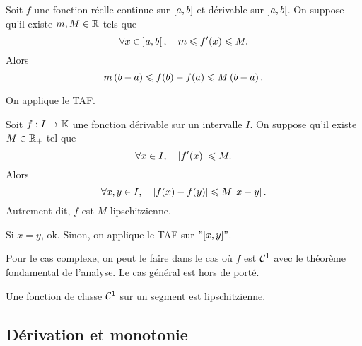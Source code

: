 \documentclass{magnoliaold}
\begin{document}
\begin{proposition}[utile=-3,nom={Inégalité des accroissements finis}]
Soit $f$ une fonction réelle continue sur $\left[a,b\right]$ et
dérivable sur $\left]a,b\right[$. On suppose qu'il existe $m,M\in\mathbb{R}$ tels que
\[\forall x\in\left]a,b\right[ ,\quad m\leqslant f'(x)\leqslant M.\]
 Alors
\[m\left(b-a\right)\leqslant f(b)-f(a)\leqslant M\left(b-a\right).\]
\end{proposition}

\begin{preuve}
On applique le TAF.
\end{preuve}

\begin{proposition}[nom={Inégalité des accroissements finis}]
Soit $f:I\to\mathbb{K}$ une fonction dérivable sur un intervalle $I$.
On suppose qu'il existe $M\in\mathbb{R}_+$ tel que
\[\forall x\in I ,\quad \left|f'(x)\right|\leqslant M.\]
Alors
\[\forall x, y\in I,\quad \left|f(x)-f(y)\right|\leqslant M\left|x-y\right|.\]
Autrement dit, $f$ est $M$-lipschitzienne.
\end{proposition}

\begin{preuve}
  Si $x=y$, ok. Sinon, on applique le TAF sur $"[x,y]"$.
  
  Pour le cas complexe, on peut le faire dans le cas où $f$ est $\mathcal{C}^{1}$ avec le théorème fondamental de l'analyse. Le cas général est hors de porté.
  \end{preuve}

\begin{remarqueUnique}
\remarque Une fonction de classe $\mathcal{C}^{1}$ sur un segment est
  lipschitzienne.
\end{remarqueUnique}


\subsection{Dérivation et monotonie}
\end{document}
